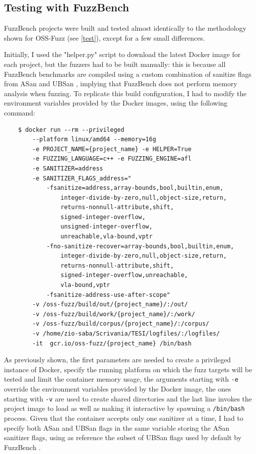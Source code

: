 \newpage
\subsection{Testing with FuzzBench}
FuzzBench projects were built and tested almost identically to the methodology shown for OSS-Fuzz (see \ref{test}), except for a few small differences.

Initially, I used the "helper.py" script to download the latest Docker image for each project, but the fuzzers had to be built manually: this is because all FuzzBench benchmarks are compiled using a custom combination of sanitize flags from ASan and UBSan \cite{flags}, implying that FuzzBench does not perform memory analysis when fuzzing. To replicate this build configuration, I had to modify the environment variables provided by the Docker images, using the following command:
\begin{verbatim}
    $ docker run --rm --privileged 
        --platform linux/amd64 --memory=16g 
        -e PROJECT_NAME={project_name} -e HELPER=True 
        -e FUZZING_LANGUAGE=c++ -e FUZZING_ENGINE=afl 
        -e SANITIZER=address 
        -e SANITIZER_FLAGS_address="
            -fsanitize=address,array-bounds,bool,builtin,enum,
                integer-divide-by-zero,null,object-size,return,
                returns-nonnull-attribute,shift,
                signed-integer-overflow,
                unsigned-integer-overflow,
                unreachable,vla-bound,vptr
            -fno-sanitize-recover=array-bounds,bool,builtin,enum,
                integer-divide-by-zero,null,object-size,return,
                returns-nonnull-attribute,shift,
                signed-integer-overflow,unreachable,
                vla-bound,vptr 
            -fsanitize-address-use-after-scope" 
        -v /oss-fuzz/build/out/{project_name}/:/out/  
        -v /oss-fuzz/build/work/{project_name}/:/work/
        -v /oss-fuzz/build/corpus/{project_name}/:/corpus/
        -v /home/zio-saba/Scrivania/TESI/logfiles/:/logfiles/  
        -it  gcr.io/oss-fuzz/{project_name} /bin/bash
\end{verbatim}
As previously shown, the first parameters are needed to create a privileged instance of Docker, specify the running platform on which the fuzz targets will be tested and limit the container memory usage, the arguments starting with \verb|-e| override the environment variables provided by the Docker image, the ones starting with \verb|-v| are used to create shared directories and the last line invokes the project image to load as well as making it interactive by spawning a \verb|/bin/bash| process.
Given that the container accepts only one sanitizer at a time, I had to specify both ASan and UBSan flags in the same variable storing the ASan sanitizer flags, using as reference the subset of UBSan flags used by default by FuzzBench \cite{flags}.

